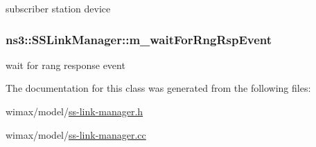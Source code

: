 subscriber station device 

\subsubsection[{\texorpdfstring{m\+\_\+wait\+For\+Rng\+Rsp\+Event}{m_waitForRngRspEvent}}]{ ns3\+::\+S\+S\+Link\+Manager\+::m\+\_\+wait\+For\+Rng\+Rsp\+Event\hspace{0.3cm}{\ttfamily [private]}}\hypertarget{classns3_1_1SSLinkManager_a6e94b74ad20fe217bf121b94deeca1ba}{}\label{classns3_1_1SSLinkManager_a6e94b74ad20fe217bf121b94deeca1ba}


wait for rang response event 



The documentation for this class was generated from the following files\+:\begin{DoxyCompactItemize}
\item 
wimax/model/\hyperlink{ss-link-manager_8h}{ss-\/link-\/manager.\+h}\item 
wimax/model/\hyperlink{ss-link-manager_8cc}{ss-\/link-\/manager.\+cc}\end{DoxyCompactItemize}
